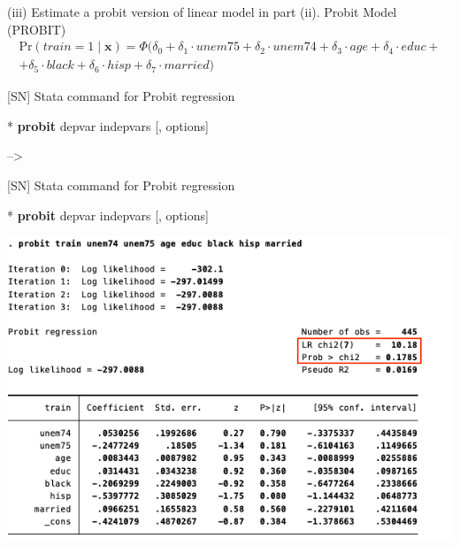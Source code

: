 \documentclass[
  10pt,
  ignorenonframetext,
]{beamer}
\newenvironment{Shaded}{\begin{snugshade}}{\end{snugshade}}
\newcommand{\KeywordTok}[1]{\textcolor[rgb]{0.13,0.29,0.53}{\textbf{#1}}}
\newcommand{\NormalTok}[1]{#1}
\begin{document}
\begin{frame}{(iii) Estimate a probit version of linear model in part
(ii).}
\protect\hypertarget{iii-estimate-a-probit-version-of-linear-model-in-part-ii.}{}
Probit Model (PROBIT) \small \[
\begin{aligned}
\text{Pr}(train = 1 \mid \mathbf{x}) = \Phi(\delta_0 + \delta_1 \cdot unem75 + \delta_2 \cdot unem74 + \delta_3 \cdot age + \delta_4 \cdot educ +\\
+ \delta_5 \cdot black + \delta_6 \cdot hisp + \delta_7 \cdot married)
\end{aligned}
\]
\end{frame}

\begin{frame}[fragile]{{[}SN{]} Stata command for Probit regression}
\protect\hypertarget{sn-stata-command-for-probit-regression}{}
\small

\begin{Shaded}
\begin{Highlighting}[]
\NormalTok{* }\KeywordTok{probit}\NormalTok{ depvar indepvars [, options]}
\end{Highlighting}
\end{Shaded}

--\textgreater{}
\end{frame}

\begin{frame}[fragile]{{[}SN{]} Stata command for Probit regression}
\protect\hypertarget{sn-stata-command-for-probit-regression-1}{}
\small

\begin{Shaded}
\begin{Highlighting}[]
\NormalTok{* }\KeywordTok{probit}\NormalTok{ depvar indepvars [, options]}
\end{Highlighting}
\end{Shaded}

\begin{center}\includegraphics[width=0.85\linewidth]{pictures/PROBITtrain} \end{center}
\end{frame}
\end{document}
